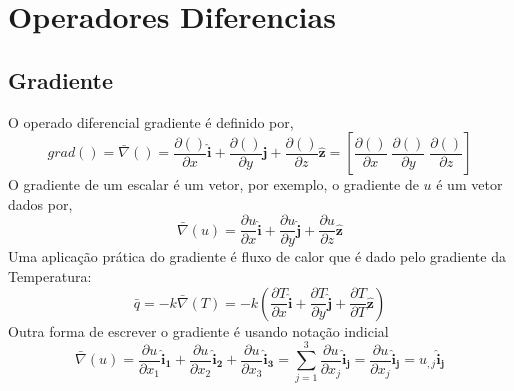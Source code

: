 \section{Operadores Diferencias}
%
\subsection{Gradiente}
%
O operado diferencial gradiente é definido por,
%
\begin{equation}
	grad() = \bar \nabla() = \frac{\partial()}{\partial x} \pmb{\hat i} + \frac{\partial()}{\partial y} \pmb{\hat j} + \frac{\partial()}{\partial z} \pmb{\hat z} = \left[\frac{\partial()}{\partial x}\; \frac{\partial()}{\partial y}\; \frac{\partial()}{\partial z}  \right]
\end{equation}
%
O gradiente de um escalar é um vetor, por exemplo, o gradiente de $u$ é um vetor dados por,
%
\begin{equation}
	\bar \nabla(u) = \frac{\partial u}{\partial x} \pmb{\hat i} + \frac{\partial u}{\partial y} \pmb{\hat j} + \frac{\partial u }{\partial z} \pmb{\hat z}
\end{equation}
%
Uma aplicação prática do gradiente é fluxo de calor que é dado pelo gradiente da Temperatura:
%
\begin{equation}
	\bar q = - k \bar \nabla(T) = - k \left(\frac{\partial T}{\partial x} \pmb{\hat i} + \frac{\partial T}{\partial y} \pmb{\hat j} + \frac{\partial T}{\partial T} \pmb{\hat z}\right)
\end{equation}
%
Outra forma de escrever o gradiente é usando notação indicial
%
\begin{equation}
	\bar \nabla(u) = \frac{\partial u}{\partial x_1} \pmb{\hat i_1} + \frac{\partial u}{\partial x_2} \pmb{\hat i_2} + \frac{\partial u}{\partial x_3} \pmb{\hat i_3} = \sum_{j = 1}^3 \frac{\partial u}{\partial x_j} \pmb{\hat i_j} =  \frac{\partial u}{\partial x_j} \pmb{\hat i_j} = u_{,j} \pmb{\hat i_j}
\end{equation}
%
